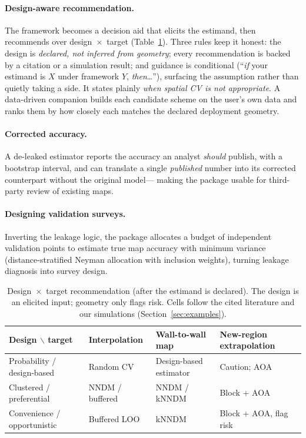 \documentclass[11pt,a4paper]{article}
\begin{document}
\paragraph{Design-aware recommendation.} The framework becomes a decision aid that
elicits the estimand, then recommends over design~$\times$~target
(Table~\ref{tab:matrix}). Three rules keep it honest: the design is \emph{declared,
not inferred from geometry}; every recommendation is backed by a citation or a
simulation result; and guidance is conditional (``\emph{if} your estimand is $X$
under framework $Y$, \emph{then}\ldots''), surfacing the assumption rather than
quietly taking a side. It states plainly \emph{when spatial CV is not appropriate}.
A data-driven companion builds each candidate scheme on the user's own data and ranks
them by how closely each matches the declared deployment geometry.

\paragraph{Corrected accuracy.} A de-leaked estimator reports the accuracy an analyst
\emph{should} publish, with a bootstrap interval, and can translate a single
\emph{published} number into its corrected counterpart without the original model---
making the package usable for third-party review of existing maps.

\paragraph{Designing validation surveys.} Inverting the leakage logic, the package
allocates a budget of independent validation points to estimate true map accuracy
with minimum variance (distance-stratified Neyman allocation with inclusion weights),
turning leakage diagnosis into survey design.

\begin{table}[t]
\centering
\caption{Design~$\times$~target recommendation (after the estimand is declared). The
design is an elicited input; geometry only flags risk. Cells follow the cited
literature and our simulations (Section~\ref{sec:examples}).}
\label{tab:matrix}
\small
\begin{tabular}{p{3.3cm} p{2.9cm} p{2.9cm} p{3.1cm}}
\toprule
\textbf{Design $\backslash$ target} & \textbf{Interpolation} &
\textbf{Wall-to-wall map} & \textbf{New-region extrapolation}\\
\midrule
Probability / design-based & Random CV & Design-based estimator & Caution; AOA\\
Clustered / preferential & NNDM / buffered & NNDM / kNNDM & Block + AOA\\
Convenience / opportunistic & Buffered LOO & kNNDM & Block + AOA, flag risk\\
\bottomrule
\end{tabular}
\end{table}
\end{document}
